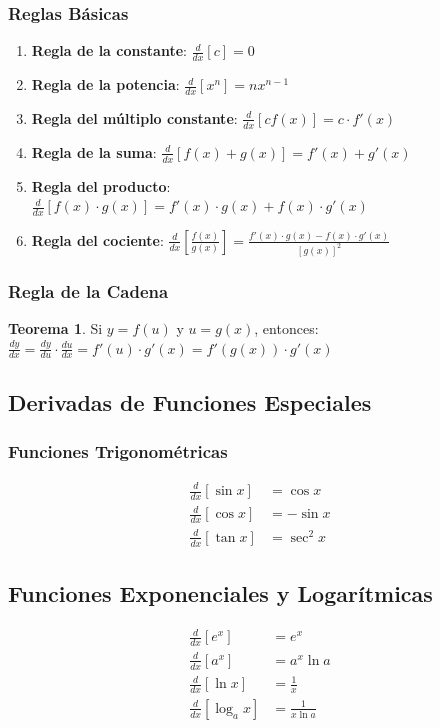 \documentclass[12pt, a4paper, oneside]{book}
\theoremstyle{definition}
\newtheorem{teorema}{Teorema}[chapter]
\begin{document}
\subsubsection{Reglas Básicas}

\begin{enumerate}
    \item \textbf{Regla de la constante}: $\frac{d}{dx}[c] = 0$
    \item \textbf{Regla de la potencia}: $\frac{d}{dx}[x^n] = nx^{n-1}$
    \item \textbf{Regla del múltiplo constante}: $\frac{d}{dx}[cf(x)] = c \cdot f'(x)$
    \item \textbf{Regla de la suma}: $\frac{d}{dx}[f(x) + g(x)] = f'(x) + g'(x)$
    \item \textbf{Regla del producto}: $\frac{d}{dx}[f(x) \cdot g(x)] = f'(x) \cdot g(x) + f(x) \cdot g'(x)$
    \item \textbf{Regla del cociente}: $\frac{d}{dx}\left[\frac{f(x)}{g(x)}\right] = \frac{f'(x) \cdot g(x) - f(x) \cdot g'(x)}{[g(x)]^2}$
\end{enumerate}

\subsubsection{Regla de la Cadena}

\begin{teorema}
Si $y = f(u)$ y $u = g(x)$, entonces:
$\frac{dy}{dx} = \frac{dy}{du} \cdot \frac{du}{dx} = f'(u) \cdot g'(x) = f'(g(x)) \cdot g'(x)$
\end{teorema}

\subsection{Derivadas de Funciones Especiales}

\subsubsection{Funciones Trigonométricas}
\begin{align}
\frac{d}{dx}[\sin x] &= \cos x \\
\frac{d}{dx}[\cos x] &= -\sin x \\
\frac{d}{dx}[\tan x] &= \sec^2 x
\end{align}

\subsection{Funciones Exponenciales y Logarítmicas}
\begin{align}
\frac{d}{dx}[e^x] &= e^x \\
\frac{d}{dx}[a^x] &= a^x \ln a \\
\frac{d}{dx}[\ln x] &= \frac{1}{x} \\
\frac{d}{dx}[\log_a x] &= \frac{1}{x \ln a}
\end{align}
\end{document}
